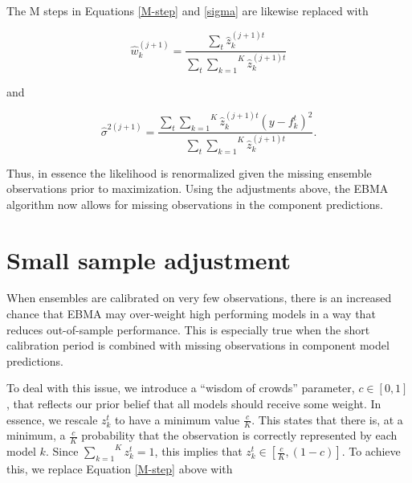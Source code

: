 \documentclass[12pt,fullpage,endnotes]{article}
\begin{document}
\noindent  The M steps in Equations \ref{M-step} and \ref{sigma} are likewise replaced with

\begin{equation}
\hat{w}^{(j+1)}_k=\frac{\underset{t}{\sum}\hat{z}^{(j+1)t}_{k}}{\underset{t}{\sum}\overset{K}{\underset{k=1}{ \sum}} \hat{z}_k^{(j+1)t}}
\end{equation}


\noindent and

\begin{equation}
\hat{\sigma}^{2(j+1)}=\frac{\underset{t}{\sum}\overset{K}{\underset{k=1}{\sum}}\hat{z}^{(j+1)t}_{k}(y-f_{k}^{t})^2 }{\underset{t}{\sum}\overset{K}{\underset{k=1}{ \sum}} \hat{z}_k^{(j+1)t}}.
\end{equation}

\noindent Thus, in essence the likelihood is renormalized given the
missing ensemble observations prior to maximization. Using the
adjustments above, the EBMA algorithm now allows for missing
observations in the component predictions.


\section{Small sample adjustment}
\label{woc}

When ensembles are calibrated on very few observations, there is an
increased chance that EBMA may over-weight high performing models in a
way that reduces out-of-sample performance. This is especially true
when the short calibration period is combined with missing
observations in component model
predictions. %

To deal with this issue, we introduce a ``wisdom of crowds''
parameter, $c \in [0,1]$, that reflects our prior belief that all
models should receive some weight.  In essence, we rescale $z^t_k$ to
have a minimum value $\frac{c}{K}$.  This states that there is, at a
minimum, a $\frac{c}{K}$ probability that the observation is correctly
represented by each model $k$.  Since
$\overset{K}{\underset{k=1}{\sum}} z_k^t = 1$, this implies that
$z_k^t \in [\frac{c}{K}, (1-c)]$.  To achieve this, we replace
Equation \ref{M-step} above with
\end{document}
